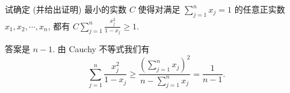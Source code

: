 \begin{prob}
\label{prob:prob-10}
试确定 (并给出证明) 最小的实数 $C$ 使得对满足
$\sum_{j=1}^n x_j = 1$ 的任意正实数 $x_1, x_2, \cdots, x_n$, 都有
$C\sum_{j=1}^n \frac{x_j^2}{1 - x_j} \ge 1$.
\end{prob}

\begin{soln}
答案是 $\boxed{n-1}$.
由 Cauchy 不等式我们有
\[
\sum_{j=1}^n \frac{x_j^2}{1 - x_j}
\ge
\frac{(\sum_{j=1}^n x_j)^2}{n - \sum_{j=1}^n x_j}
= \frac{1}{n-1}.
\]
\end{soln}
